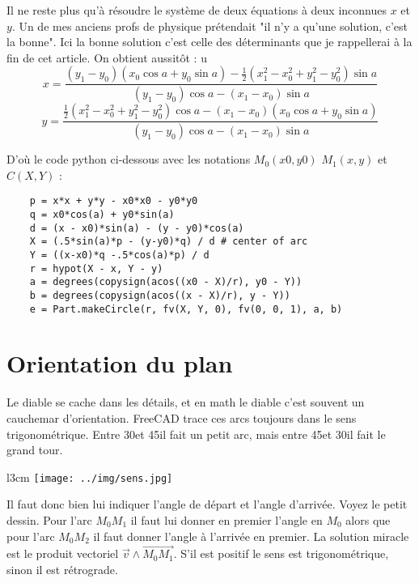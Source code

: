 \documentclass[a4paper]{article}
\begin{document}
Il ne reste plus qu'\`a r\'esoudre le syst\`eme de deux \'equations \`a deux inconnues $ x $ et $ y $. Un de mes anciens profs de physique pr\'etendait "il n'y a qu'une solution, c'est la bonne". Ici la bonne solution c'est celle des d\'eterminants que je rappellerai à la fin de cet article. On obtient aussit\^ot :
u
\begin{equation}
x = \frac{(y_1 - y_0)(x_0 \cos a + y_0 \sin a) - \frac{1}{2}(x_1 ^2 - x_0 ^2 + y_1 ^2 - y_0 ^2)\sin a}{(y_1 - y_0)\cos a - (x_1 - x_0)\sin a } \label{eq:5}
\end{equation}
\begin{equation}
y = \frac{\frac{1}{2}(x_1 ^2 - x_0 ^2 + y_1 ^2 - y_0 ^2)\cos a - (x_1 - x_0)(x_0 \cos a + y_0 \sin a)}{(y_1 - y_0)\cos a - (x_1 - x_0)\sin a}\label{eq:6}
\end{equation}

D'où le code python ci-dessous avec les notations $M_0 (x0, y0)$ $M_1 (x, y)$ et $C(X, Y)$ :

\begin{lstlisting}
	p = x*x + y*y - x0*x0 - y0*y0
	q = x0*cos(a) + y0*sin(a)
	d = (x - x0)*sin(a) - (y - y0)*cos(a)
	X = (.5*sin(a)*p - (y-y0)*q) / d # center of arc
	Y = ((x-x0)*q -.5*cos(a)*p) / d
	r = hypot(X - x, Y - y)
	a = degrees(copysign(acos((x0 - X)/r), y0 - Y))
	b = degrees(copysign(acos((x - X)/r), y - Y))
	e = Part.makeCircle(r, fv(X, Y, 0), fv(0, 0, 1), a, b)
\end{lstlisting}
\newpage
\section{Orientation du plan}
Le diable se cache dans les détails, et en math le diable c'est souvent un cauchemar d'orientation. FreeCAD trace ces arcs toujours dans le sens trigonométrique. Entre 30\degre et 45\degre il fait un petit arc, mais entre 45\degre et 30\degre il fait le grand tour. 
\begin{wrapfigure}[7]{l}{3cm}
\texttt{[image: ../img/sens.jpg]} 
\end{wrapfigure}

Il faut donc bien lui indiquer l'angle de départ et l'angle d'arrivée. Voyez le petit dessin. Pour l'arc $M_0 M_1$ il faut lui donner en premier l'angle en $M_0$ alors que pour l'arc $M_0 M_2$ il faut donner l'angle à l'arrivée en premier. La solution miracle est le produit vectoriel $\vec{v} \wedge \overrightarrow{M_0 M_1}$. S'il est positif le sens est trigonométrique, sinon il est rétrograde. 
\end{document}
